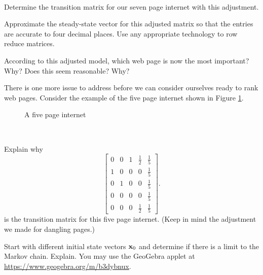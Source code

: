 \begin{pactivity} \label{LQ:G2} ~
    \ba
    \item Determine the transition matrix for our seven page internet with this adjustment.

    \item Approximate the steady-state vector for this adjusted matrix so that the entries are accurate to four decimal places. Use any appropriate technology to row reduce matrices.
   

    \item According to this adjusted model, which web page is now the most important? Why? Does this seem reasonable? Why?


    \ea
\end{pactivity}

There is one more issue to address before we can consider ourselves ready to rank web pages. Consider the example of the five page internet shown in Figure \ref{F:five_page}.


\begin{figure}[h]
\begin{center}
\caption{A five page internet}
\label{F:five_page}
\end{center}
\end{figure}


\begin{pactivity} \label{Q:no_limit} ~
    \ba
    \item Explain why
    \[\renewcommand{\arraystretch}{1.2} \left[ \begin{array}{ccccc} 0&0&1&\frac{1}{2}&\frac{1}{5} \\ 1&0&0&0&\frac{1}{5} \\ 0&1&0&0&\frac{1}{5} \\ 0&0&0&0&\frac{1}{5} \\ 0&0&0&\frac{1}{2}&\frac{1}{5} \end{array} \right].\]
is the transition matrix for this five page internet. (Keep in mind the adjustment we made for dangling pages.)

    \item Start with different initial state vectors $\mathbf{x}_0$ and determine if there is a limit to the Markov chain. Explain. You may use the GeoGebra applet at \url{https://www.geogebra.org/m/b3dybnux}.  


    \ea
\end{pactivity}



